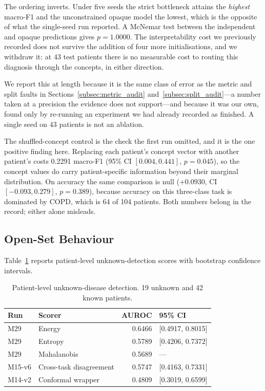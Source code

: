\documentclass[journal,onecolumn]{IEEEtran}
\begin{document}
The ordering inverts. Under five seeds the strict bottleneck attains the \emph{highest}
macro-F1 and the unconstrained opaque model the lowest, which is the opposite of what
the single-seed run reported. A McNemar test between the independent and opaque
predictions gives $p=1.0000$. The interpretability cost we previously recorded does not
survive the addition of four more initialisations, and we withdraw it: at 43 test
patients there is no measurable cost to routing this diagnosis through the concepts, in
either direction.

We report this at length because it is the same class of error as the metric and split
faults in Sections~\ref{subsec:metric_audit} and~\ref{subsec:split_audit}---a number
taken at a precision the evidence does not support---and because it was our own, found
only by re-running an experiment we had already recorded as finished. A single seed on
43 patients is not an ablation.

The shuffled-concept control is the check the first run omitted, and it is the one
positive finding here. Replacing each patient's concept vector with another patient's
costs 0.2291 macro-F1 (95\% CI $[0.004, 0.441]$, $p=0.045$), so the concept values do
carry patient-specific information beyond their marginal distribution. On accuracy the
same comparison is null ($+0.0930$, CI $[-0.093, 0.279]$, $p=0.389$), because accuracy
on this three-class task is dominated by COPD, which is 64 of 104 patients. Both
numbers belong in the record; either alone misleads.

\subsection{Open-Set Behaviour}
\label{subsec:openset}

Table~\ref{tab:openset} reports patient-level unknown-detection scores with bootstrap
confidence intervals.

\begin{table}[!t]
\centering
\caption{Patient-level unknown-disease detection. 19 unknown and 42 known patients.}
\label{tab:openset}
\begin{tabular}{llrl}
\toprule
Run & Scorer & AUROC & 95\% CI \\
\midrule
M29    & Energy                 & 0.6466 & [0.4917, 0.8015] \\
M29    & Entropy                & 0.5789 & [0.4206, 0.7372] \\
M29    & Mahalanobis            & 0.5689 & --- \\
M15-v6 & Cross-task disagreement& 0.5747 & [0.4163, 0.7331] \\
M14-v2 & Conformal wrapper      & 0.4809 & [0.3019, 0.6599] \\
\bottomrule
\end{tabular}
\end{table}
\end{document}
